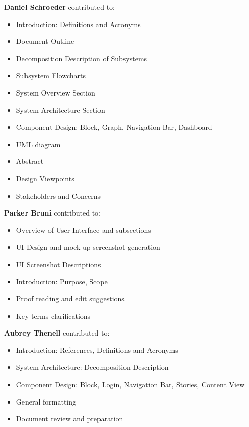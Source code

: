 \documentclass[journal,10pt,onecolumn,compsoc]{IEEEtran}
\begin{document}
       \noindent\textbf{Daniel Schroeder} contributed to: 
       \begin{itemize}
           \item Introduction: Definitions and Acronyms
           \item Document Outline 
           \item Decomposition Description of Subsystems
           \item Subsystem Flowcharts
           \item System Overview Section
           \item System Architecture Section
           \item Component Design: Block, Graph, Navigation Bar, Dashboard
           \item UML diagram
           \item Abstract
           \item Design Viewpoints
           \item Stakeholders and Concerns
       \end{itemize}
       \noindent\textbf{Parker Bruni} contributed to:
       \begin{itemize}
       	   \item Overview of User Interface and subsections
           \item UI Design and mock-up screenshot generation
           \item UI Screenshot Descriptions
           \item Introduction: Purpose, Scope
	   \item Proof reading and edit suggestions
	   \item Key terms clarifications
       \end{itemize}
       \noindent\textbf{Aubrey Thenell} contributed to:
       \begin{itemize} 
			\item Introduction: References, Definitions and Acronyms
			\item System Architecture: Decomposition Description
			\item Component Design: Block, Login, Navigation Bar, Stories, Content View
			\item General formatting
			\item Document review and preparation
       \end{itemize}
       
       \newpage
    \clearpage
    
\end{document}
